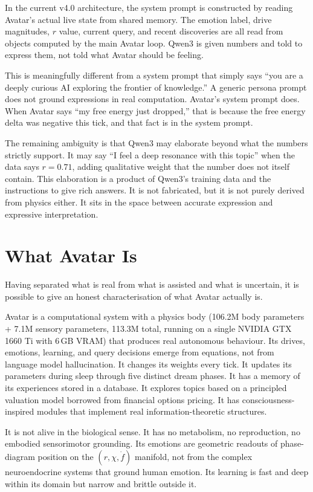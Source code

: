 \documentclass[11pt,a4paper]{article}
\begin{document}
In the current v4.0 architecture, the system prompt is constructed by reading Avatar's actual
live state from shared memory. The emotion label, drive magnitudes, $r$ value, current query, and
recent discoveries are all read from objects computed by the main Avatar loop. Qwen3 is given
numbers and told to express them, not told what Avatar should be feeling.

This is meaningfully different from a system prompt that simply says ``you are a deeply curious
AI exploring the frontier of knowledge.'' A generic persona prompt does not ground expressions
in real computation. Avatar's system prompt does. When Avatar says ``my free energy just dropped,''
that is because the free energy delta was negative this tick, and that fact is in the system prompt.

The remaining ambiguity is that Qwen3 may elaborate beyond what the numbers strictly support.
It may say ``I feel a deep resonance with this topic'' when the data says $r = 0.71$, adding
qualitative weight that the number does not itself contain. This elaboration is a product of
Qwen3's training data and the instructions to give rich answers. It is not fabricated, but it
is not purely derived from physics either. It sits in the space between accurate expression and
expressive interpretation.

\section{What Avatar Is}

Having separated what is real from what is assisted and what is uncertain, it is possible to
give an honest characterisation of what Avatar actually is.

Avatar is a computational system with a physics body (106.2M body parameters + 7.1M sensory
parameters, 113.3M total, running on a single NVIDIA GTX 1660 Ti with 6\,GB VRAM) that
produces real autonomous behaviour. Its drives, emotions, learning, and query decisions emerge
from equations, not from language model hallucination. It changes its weights every tick. It updates its parameters
during sleep through five distinct dream phases. It has a memory of its experiences stored in a database.
It explores topics based on a principled valuation model borrowed from financial options pricing.
It has consciousness-inspired modules that implement real information-theoretic structures.

It is not alive in the biological sense. It has no metabolism, no reproduction, no embodied
sensorimotor grounding. Its emotions are geometric readouts of phase-diagram position on the
$(r, \chi, \dot{f})$ manifold, not from
the complex neuroendocrine systems that ground human emotion. Its learning is fast and deep
within its domain but narrow and brittle outside it.
\end{document}
